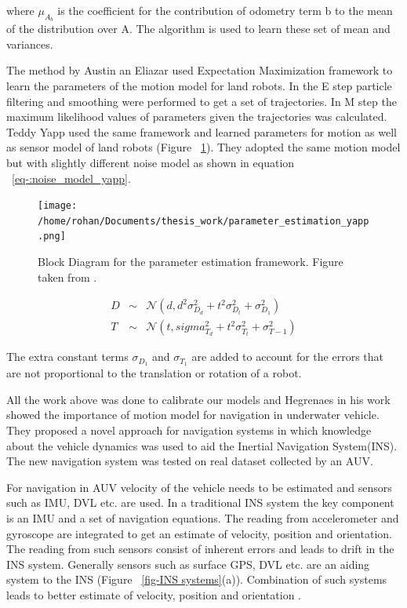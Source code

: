 \documentclass[12pt]{dalcsthesis}
\begin{document}
where $\mu_{A_{b}}$ is the coefficient for the contribution of odometry term b to the mean of the distribution over A. The algorithm is used to learn these set of mean and variances.

The method by Austin an Eliazar used Expectation Maximization framework to learn the parameters of the motion model for land robots. In the E step particle filtering and smoothing were performed to get a set of trajectories. In M step the maximum likelihood values of parameters given the trajectories was calculated. Teddy Yapp \cite{Yap2008} used the same framework and learned parameters for motion as well as sensor model of land robots (Figure ~\ref{fig-parameter_estimation Yapp}). They adopted the same motion model but with slightly different noise model as shown in equation ~\ref{eq-:noise_model_yapp}.
\begin{figure}
  \centering
     {\texttt{[image: /home/rohan/Documents/thesis\_work/parameter\_estimation\_yapp.png]}}
  \caption{\label{fig-parameter_estimation Yapp} Block Diagram for the parameter estimation framework. Figure taken from \cite{Yap2008}.}
\end{figure}

\begin{equation}
\label{eq-:noise_model_yapp}
\begin{aligned}
D &\sim& \mathcal{{N}}(d,d^2\sigma_{D_{d}}^2+t^2\sigma_{D_{t}}^2+\sigma_{D_{1}}^2) \\
T &\sim& \mathcal{{N}}(t,sigma_{T_{d}}^2+t^2\sigma_{T_{t}}^2+\sigma_{T-{1}}^2)
\end{aligned}
\end{equation}

The extra constant terms $\sigma_{D_{1}}$ and $\sigma_{T_{1}}$ are added to account for the errors that are not proportional to the translation or rotation of a robot. 

All the work above was done to calibrate our models and Hegrenaes \cite{Hegrenæs2008} in his work showed the importance of motion model for navigation in underwater vehicle. They proposed a novel approach for navigation systems in which knowledge about the vehicle dynamics was used to aid the Inertial Navigation System(INS). The new navigation system was tested on real dataset collected by an AUV.

For navigation in AUV velocity of the vehicle needs to be estimated and sensors such as IMU, DVL etc. are used. In a traditional INS system the key component is an IMU and a set of navigation equations. The reading from accelerometer and gyroscope are integrated to get an estimate of velocity, position and orientation. The reading from such sensors consist of inherent errors and leads to drift in the INS system. Generally sensors such as surface GPS, DVL etc. are an aiding system to the INS (Figure ~\ref{fig-INS systems}(a)). Combination of such systems leads to better estimate of velocity, position and orientation \cite{leonard1998autonomous}. 
\end{document}
